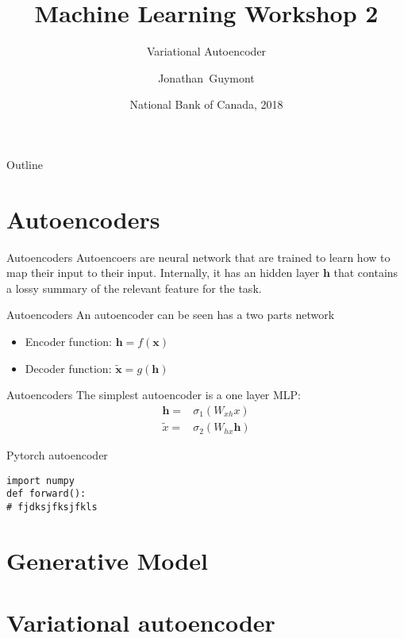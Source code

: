 \documentclass{beamer}
\title{Machine Learning Workshop 2}
\subtitle{Variational Autoencoder}
\author{Jonathan~Guymont}
\date{National Bank of Canada, 2018}
\begin{document}
\begin{frame}
	\titlepage 
\end{frame}

\begin{frame}{Outline}
	\tableofcontents
\end{frame}

\section{Autoencoders}

\begin{frame}{Autoencoders}
Autoencoers are neural network that are trained to learn how to map their input to their input. Internally, it has an hidden layer $\bm{h}$ that contains a lossy summary of the relevant feature for the task.
\end{frame}
 
\begin{frame}{Autoencoders}
An autoencoder can be seen has a two parts network
\begin{itemize}
	\item Encoder function: $\bm{h}=f(\bm{x})$
	\item Decoder function: $\tilde{\bm{x}} = g(\bm{h})$
\end{itemize}
\end{frame}

\begin{frame}{Autoencoders}
The simplest autoencoder is a one layer MLP:
\begin{equation}
\begin{split}
\bm{h} =& \sigma_1\left(W_{xh}x\right)\\
\tilde{x} =& \sigma_2\left(W_{hx}\bm{h}\right) 
\end{split}
\end{equation}
\end{frame}

\begin{frame}[fragile]{Pytorch autoencoder}
\begin{verbatim}
import numpy
def forward():
# fjdksjfksjfkls
\end{verbatim}
\end{frame}

\section{Generative Model}


\section{Variational autoencoder}
\end{document}

